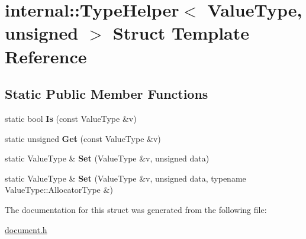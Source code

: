 \hypertarget{a00322}{}\section{internal\+:\+:Type\+Helper$<$ Value\+Type, unsigned $>$ Struct Template Reference}
\label{a00322}
\subsection*{Static Public Member Functions}
\begin{DoxyCompactItemize}
\item 
static bool {\bfseries Is} (const Value\+Type \&v)\hypertarget{a00322_ad1c1cb931ed166508d17e866d410c99b}{}\label{a00322_ad1c1cb931ed166508d17e866d410c99b}

\item 
static unsigned {\bfseries Get} (const Value\+Type \&v)\hypertarget{a00322_a2f91befe1e9e914e7431b84c0d89f572}{}\label{a00322_a2f91befe1e9e914e7431b84c0d89f572}

\item 
static Value\+Type \& {\bfseries Set} (Value\+Type \&v, unsigned data)\hypertarget{a00322_a1d960542fd618ac649fe4e045c44f789}{}\label{a00322_a1d960542fd618ac649fe4e045c44f789}

\item 
static Value\+Type \& {\bfseries Set} (Value\+Type \&v, unsigned data, typename Value\+Type\+::\+Allocator\+Type \&)\hypertarget{a00322_a601b05a233b6025486a9105d45d46780}{}\label{a00322_a601b05a233b6025486a9105d45d46780}

\end{DoxyCompactItemize}


The documentation for this struct was generated from the following file\+:\begin{DoxyCompactItemize}
\item 
\hyperlink{a00473}{document.\+h}\end{DoxyCompactItemize}
